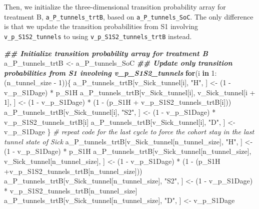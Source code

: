 \documentclass[
]{article}
\newenvironment{Shaded}{\begin{snugshade}}{\end{snugshade}}
\newcommand{\CommentTok}[1]{\textcolor[rgb]{0.56,0.35,0.01}{\textit{#1}}}
\newcommand{\ControlFlowTok}[1]{\textcolor[rgb]{0.13,0.29,0.53}{\textbf{#1}}}
\newcommand{\DecValTok}[1]{\textcolor[rgb]{0.00,0.00,0.81}{#1}}
\newcommand{\DocumentationTok}[1]{\textcolor[rgb]{0.56,0.35,0.01}{\textbf{\textit{#1}}}}
\newcommand{\NormalTok}[1]{#1}
\newcommand{\OtherTok}[1]{\textcolor[rgb]{0.56,0.35,0.01}{#1}}
\newcommand{\SpecialCharTok}[1]{\textcolor[rgb]{0.00,0.00,0.00}{#1}}
\newcommand{\StringTok}[1]{\textcolor[rgb]{0.31,0.60,0.02}{#1}}
\begin{document}
Then, we initialize the three-dimensional transition probability array for treatment B, \texttt{a\_P\_tunnels\_trtB}, based on \texttt{a\_P\_tunnels\_SoC}. The only difference is that we update the transition probabilities from S1 involving \texttt{v\_p\_S1S2\_tunnels} to using \texttt{v\_p\_S1S2\_tunnels\_trtB} instead.

\begin{Shaded}
\begin{Highlighting}[]
\DocumentationTok{\#\# Initialize transition probability array for treatment B}
\NormalTok{a\_P\_tunnels\_trtB }\OtherTok{\textless{}{-}}\NormalTok{ a\_P\_tunnels\_SoC}
\DocumentationTok{\#\# Update only transition probabilities from S1 involving v\_p\_S1S2\_tunnels}
\ControlFlowTok{for}\NormalTok{(i }\ControlFlowTok{in} \DecValTok{1}\SpecialCharTok{:}\NormalTok{(n\_tunnel\_size }\SpecialCharTok{{-}} \DecValTok{1}\NormalTok{))\{}
\NormalTok{  a\_P\_tunnels\_trtB[v\_Sick\_tunnel[i], }\StringTok{"H"}\NormalTok{, ] }\OtherTok{\textless{}{-}}\NormalTok{ (}\DecValTok{1} \SpecialCharTok{{-}}\NormalTok{ v\_p\_S1Dage) }\SpecialCharTok{*}\NormalTok{ p\_S1H}
\NormalTok{  a\_P\_tunnels\_trtB[v\_Sick\_tunnel[i], }
\NormalTok{              v\_Sick\_tunnel[i }\SpecialCharTok{+} \DecValTok{1}\NormalTok{], ] }\OtherTok{\textless{}{-}}\NormalTok{ (}\DecValTok{1} \SpecialCharTok{{-}}\NormalTok{ v\_p\_S1Dage) }\SpecialCharTok{*} 
\NormalTok{                                         (}\DecValTok{1} \SpecialCharTok{{-}}\NormalTok{ (p\_S1H }\SpecialCharTok{+}\NormalTok{ v\_p\_S1S2\_tunnels\_trtB[i]))}
\NormalTok{  a\_P\_tunnels\_trtB[v\_Sick\_tunnel[i], }\StringTok{"S2"}\NormalTok{, ] }\OtherTok{\textless{}{-}}\NormalTok{ (}\DecValTok{1} \SpecialCharTok{{-}}\NormalTok{ v\_p\_S1Dage) }\SpecialCharTok{*}\NormalTok{ v\_p\_S1S2\_tunnels\_trtB[i]}
\NormalTok{  a\_P\_tunnels\_trtB[v\_Sick\_tunnel[i], }\StringTok{"D"}\NormalTok{, ]  }\OtherTok{\textless{}{-}}\NormalTok{ v\_p\_S1Dage}
\NormalTok{\}}
\CommentTok{\# repeat code for the last cycle to force the cohort stay in the last tunnel state of Sick}
\NormalTok{a\_P\_tunnels\_trtB[v\_Sick\_tunnel[n\_tunnel\_size], }\StringTok{"H"}\NormalTok{, ] }\OtherTok{\textless{}{-}}\NormalTok{ (}\DecValTok{1} \SpecialCharTok{{-}}\NormalTok{ v\_p\_S1Dage) }\SpecialCharTok{*}\NormalTok{ p\_S1H}
\NormalTok{a\_P\_tunnels\_trtB[v\_Sick\_tunnel[n\_tunnel\_size],}
\NormalTok{            v\_Sick\_tunnel[n\_tunnel\_size], ] }\OtherTok{\textless{}{-}}\NormalTok{ (}\DecValTok{1} \SpecialCharTok{{-}}\NormalTok{ v\_p\_S1Dage) }\SpecialCharTok{*} 
\NormalTok{                                               (}\DecValTok{1} \SpecialCharTok{{-}}\NormalTok{ (p\_S1H }\SpecialCharTok{+}\NormalTok{v\_p\_S1S2\_tunnels\_trtB[n\_tunnel\_size]))}
\NormalTok{a\_P\_tunnels\_trtB[v\_Sick\_tunnel[n\_tunnel\_size], }\StringTok{"S2"}\NormalTok{, ] }\OtherTok{\textless{}{-}}\NormalTok{ (}\DecValTok{1} \SpecialCharTok{{-}}\NormalTok{ v\_p\_S1Dage) }\SpecialCharTok{*}
\NormalTok{                                                           v\_p\_S1S2\_tunnels\_trtB[n\_tunnel\_size]}
\NormalTok{a\_P\_tunnels\_trtB[v\_Sick\_tunnel[n\_tunnel\_size], }\StringTok{"D"}\NormalTok{, ]  }\OtherTok{\textless{}{-}}\NormalTok{ v\_p\_S1Dage}
\end{Highlighting}
\end{Shaded}
\end{document}
